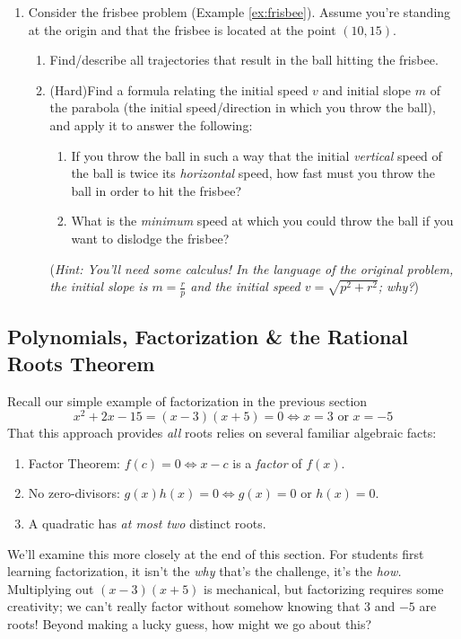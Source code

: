 \begin{exercises}{}{}
\begin{enumerate}
	  
	  \item\label{exs:frisbee} Consider the frisbee problem (Example \ref{ex:frisbee}). Assume you're standing at the origin and that the frisbee is located at the point $(10,15)$.
	  \begin{enumerate}
	    \item Find/describe all trajectories that result in the ball hitting the frisbee.
	    \item (Hard)\lstsp Find a formula relating the initial speed $v$ and initial slope $m$ of the parabola (the initial speed/direction in which you throw the ball), and apply it to answer the following:
	    \begin{enumerate}
				\item If you throw the ball in such a way that the initial \emph{vertical} speed of the ball is twice its \emph{horizontal} speed, how fast must you throw the ball in order to hit the frisbee?
	      \item What is the \emph{minimum} speed at which you could throw the ball if you want to dislodge the frisbee?
	    \end{enumerate}
	    (\emph{Hint: You'll need some calculus! In the language of the original problem, the initial slope is $m=\frac rp$ and the initial speed $v=\sqrt{p^2+r^2}$; why?})
		\end{enumerate}

	\end{enumerate}
\end{exercises}

\clearpage



\subsection{Polynomials, Factorization \& the Rational Roots Theorem}

Recall our simple example of factorization in the previous section
\[
	x^2+2x-15=(x-3)(x+5)=0\iff x=3\text{ or }x=-5
\]
That this approach provides \emph{all} roots relies on several familiar algebraic facts:
\begin{enumerate}
  \item Factor Theorem: $f(c)=0\iff x-c$ is a \emph{factor} of $f(x)$.
  \item No zero-divisors: $g(x)h(x)=0\iff g(x)=0$ or $h(x)=0$. 
  \item A quadratic has \emph{at most two} distinct roots.
\end{enumerate}
We'll examine this more closely at the end of this section. For students first learning factorization, it isn't the \emph{why} that's the challenge, it's the \emph{how.} Multiplying out $(x-3)(x+5)$ is mechanical, but factorizing requires some creativity; we can't really factor without somehow knowing that 3 and $-5$ are roots! Beyond making a lucky guess, how might we go about this? 

